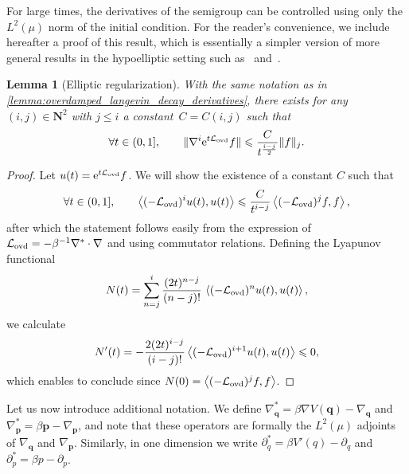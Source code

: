 \documentclass[11pt,a4paper]{article}
\newcommand{\e}{\mathrm{e}}
\newcommand{\nat}{\mathbf N}
\newcommand{\grad}{\nabla}
\newcommand{\vect}[1]{\boldsymbol{\mathbf #1}}
\theoremstyle{plain}
\newtheorem{lemma}[theorem]{Lemma}
\numberwithin{equation}{section}
\renewcommand{\leq}{\leqslant}
\begin{document}
For large times,
the derivatives of the semigroup can be controlled using only the $L^2(\mu)$ norm of the initial condition.
For the reader's convenience,
we include hereafter a proof of this result,
which is essentially a simpler version of more general results in the hypoelliptic setting such as~\cite[Theorem 2.4]{ottobre2012asymptotic} and~\cite[Theorem A.8]{MR2562709}.
\begin{lemma}
    [Elliptic regularization]
    \label{lemma:elliptic_reg}
    With the same notation as in \cref{lemma:overdamped_langevin_decay_derivatives},
    there exists for any $(i,j) \in \nat^2$ with $j \leq i$ a constant~$C = C(i, j)$ such that
    \[
        \forall t \in (0, 1], \qquad
        \norm*{\grad^i \e^{t \mathcal L_{\rm ovd}} f} \leq \frac{C}{t^{\frac{i-j}{2}}} \norm*{f}[j].
    \]
\end{lemma}
\begin{proof}
    Let $u(t) = \e^{t \mathcal L_{\rm ovd}} f$.
    We will show the existence of a constant $C$ such that
    \[
        \forall t \in (0, 1], \qquad
        \ip{(-\mathcal L_{\rm ovd})^i u(t)}{u(t)}
        \leq \frac{C}{t^{i-j}} \ip{(-\mathcal L_{\rm ovd})^j f}{f},
    \]
    after which the statement follows easily from the expression of $\mathcal L_{\rm ovd} = - \beta^{-1} \grad^* \cdot \grad$ and using commutator relations.
    Defining the Lyapunov functional
    \[
        N(t) = \sum_{n=j}^{i} \frac{(2t)^{n-j}}{(n-j)!} \, \ip{(-\mathcal L_{\rm ovd})^n u(t)}{u(t)} ,
    \]
    we calculate
    \[
        N'(t) =  - \frac{2(2t)^{i-j}}{(i-j)!} \ip{(- \mathcal L_{\rm ovd})^{i+1} u(t)}{u(t)} \leq 0,
    \]
    which enables to conclude since $N(0) = \ip{(- \mathcal L_{\rm ovd})^j f}{f}$.
\end{proof}

Let us now introduce additional notation.
We define $\nabla_{\vect q}^* = \beta \nabla V(\vect q) - \nabla_{\vect q}$ and $\nabla_{\vect p}^* = \beta \vect p - \nabla_{\vect p}$,
and note that these operators are formally the $L^2(\mu)$ adjoints of $\nabla_{\vect q}$ and $\nabla_{\vect p}$.
Similarly, in one dimension we write $\partial_q^* = \beta V'(q) - \partial_q$ and $\partial_p^* = \beta p - \partial_p$.
\end{document}
